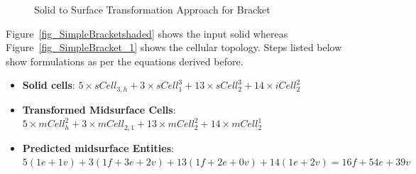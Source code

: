 \begin{figure}[h!]
\centering     %
{} \quad
{} \quad
\caption{Solid to Surface Transformation Approach for Bracket}
  \label{fig:midsurfcelljoin:solidsurfbracket}
\end{figure}


Figure~\ref{fig_SimpleBracketshaded} shows the input solid whereas Figure~\ref{fig_SimpleBracket_1} shows the cellular topology. Steps listed below show formulations as per the equations derived before.


\begin{itemize}
[noitemsep,topsep=2pt,parsep=2pt,partopsep=2pt,leftmargin=*]
	\item \textbf {Solid cells}: \newline  $5 \times sCell_{3,h} + 3 \times sCell^{3}_{1} + 13 \times sCell^{3}_{2} + 14 \times iCell^{2}_{2} $
	\item \textbf {Transformed Midsurface Cells}: \newline $5 \times mCell^{2}_{h} + 3 \times mCell_{2,1} + 13 \times mCell^{2}_{2} + 14 \times mCell^{1}_{2}$
	\item \textbf {Predicted midsurface Entities}:  \newline $5(1e+1v) + 3 (1f+3e+2v) + 13 (1f+2e+0v) + 14(1e+2v) = 
16f + 54e + 39v$
\end{itemize}


